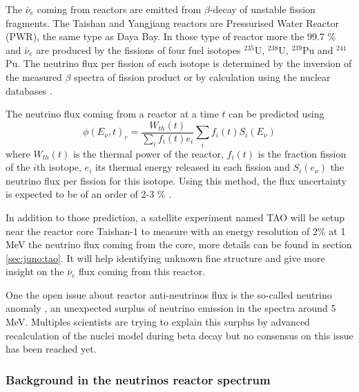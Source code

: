 The $\bar{\nu}_e$ coming from reactors are emitted from $\beta$-decay of unstable fission fragments. The Taishan and Yangjiang reactors are Pressurised Water Reactor (PWR), the same type as Daya Bay. In those type of reactor more the 99.7 \% and $\bar{\nu}_e$ are produced by the fissions of four fuel isotopes $^{235}$U, $^{238}$U, $^{239}$Pu and $^{241}$Pu. The neutrino flux per fission of each isotope is determined by the inversion of the measured $\beta$ spectra of fission product \cite{hahn_antineutrino_1989, mueller_improved_2011, von_feilitzsch_experimental_1982, schreckenbach_determination_1985, huber_determination_2011} or by calculation using the nuclear databases \cite{vogel_reactor_1981, dwyer_spectral_2015}.

The neutrino flux coming from a reactor at a time $t$ can be predicted using
\begin{equation}
  \phi(E_\nu, t)_r = \frac{W_{th}(t)}{\sum_i f_i(t) e_i} \sum_i f_i(t) S_i(E_\nu)
\end{equation}
where $W_{th}(t)$ is the thermal power of the reactor, $f_i(t)$ is the fraction fission of the $i$th isotope, $e_i$ its thermal energy released in each fission and $S_i(e_\nu)$ the neutrino flux per fission for this isotope. Using this method, the flux uncertainty is expected to be of an order of 2-3 \% \cite{juno_collaboration_sub-percent_2022}.

In addition to those prediction, a satellite experiment named TAO\cite{juno_collaboration_tao_2020} will be setup near the reactor core Taishan-1 to measure with an energy resolution of 2\% at 1 MeV the neutrino flux coming from the core, more details can be found in section \ref{sec:juno:tao}. It will help identifying unknown fine structure and give more insight on the $\bar{\nu}_e$ flux coming from this reactor.

One  the open issue about reactor anti-neutrinos flux is the so-called neutrino anomaly \cite{mention_reactor_2011}, an unexpected surplus of neutrino emission in the spectra around 5 MeV.
Multiples scientists are trying to explain this surplus by advanced recalculation of the nuclei model during beta decay \cite{kopeikin_reevaluating_2021, letourneau_origin_2023} but no consensus on this issue has been reached yet.

\subsubsection{Background in the neutrinos reactor spectrum}


